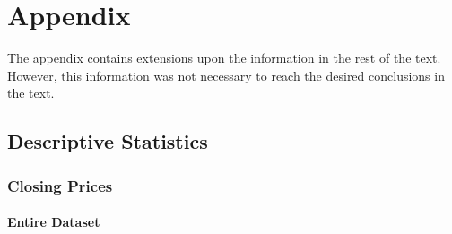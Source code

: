 
\chapter{Appendix}

The appendix contains extensions upon the information in the rest of the text. However, this information was not necessary to reach the desired conclusions in the text.

\section{Descriptive Statistics}
\label{appendix:descriptiveStatistics}

\subsection{Closing Prices}

\subsubsection{Entire Dataset}

